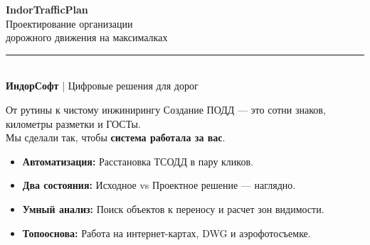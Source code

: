 \documentclass[aspectratio=169]{beamer}
\newcommand{\hl}[1]{\textcolor{AccentDrive}{\textbf{#1}}}
\newcommand{\tech}[1]{\textcolor{AccentFresh}{\textbf{#1}}}
\begin{document}
\begin{frame}
    
    \vspace{1cm}
    \hspace{3.5cm}
    \begin{minipage}{0.65\textwidth}
        \textcolor{AccentDrive}{\Huge \textbf{IndorTrafficPlan}} \\[0.5em]
        \textcolor{TextMain}{\Large Проектирование организации \\ дорожного движения на максималках} \\[1em]
        \textcolor{AccentTech}{\rule{5cm}{2pt}} \\[1em]
        \textbf{ИндорСофт} | Цифровые решения для дорог
    \end{minipage}
\end{frame}

\begin{frame}{От рутины к чистому инжинирингу}
    \Large
    Создание ПОДД — это сотни знаков, километры разметки и ГОСТы. \\
    Мы сделали так, чтобы \hl{система работала за вас}.
    
    \vspace{0.8cm}
    \normalsize
    \begin{itemize}
        \item \tech{Автоматизация:} Расстановка ТСОДД в пару кликов.
        \item \tech{Два состояния:} Исходное vs Проектное решение — наглядно.
        \item \tech{Умный анализ:} Поиск объектов к переносу и расчет зон видимости.
        \item \tech{Топооснова:} Работа на интернет-картах, DWG и аэрофотосъемке.
    \end{itemize}
\end{frame}
\end{document}
